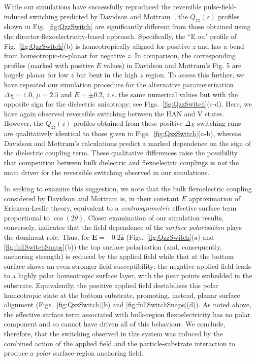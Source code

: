 \documentclass[aps,10pt,twocolumn]{revtex4}
\makeatletter
\newcommand{\vect}[1]{ \mathbf{#1} }
\newcommand{\vecth}[1]{ \mathbf{\hat{#1} } }
\newcommand{\ie}{\emph{i.e.}\@\xspace}
\makeatother
\begin{document}
While our simulations have successfully reproduced the reversible pulse-field-induced switching predicted by
Davidson and Mottram~\cite{DavidsonMottram02}, the $Q_{zz}(z)$ profiles shown in Fig.~\ref{fig:QzzSwitch} are
significantly different from those obtained using the director-flexoelectricity-based approach. Specifically, the
``E on" profile of Fig.~\ref{fig:QzzSwitch}(b) is homeotropically aligned for positive $z$ and has a bend from
homeotropic-to-planar for negative $z$. In comparison, the corresponding profiles (marked with positive $E$
values) in Davidson and Mottram's Fig. 5 are largely planar for low $z$ but bent in the high $z$ region. To assess
this further, we have repeated our simulation procedure for the alternative parameterization $\Delta\chi=1.0$,
$\mu=2.5$ and $E=\pm 0.2$, \ie the same numerical values but with the opposite sign for the dielectric anisotropy;
see Figs.~\ref{fig:QzzSwitch}(c-d). Here, we have again observed reversible switching between the HAN and V
states. However, the $Q_{zz}(z)$ profiles obtained from these positive $\Delta\chi$ switching runs are
qualitatively identical to those given in Figs.~\ref{fig:QzzSwitch}(a-b), whereas Davidson and Mottram's
calculations predict a marked dependence on the sign of the dielectric coupling term. These qualitative
differences raise the possibility that competition between bulk dielectric and flexoelectric couplings is
\emph{not} the main driver for the reversible switching observed in our simulations.

In seeking to examine this suggestion, we note that the bulk flexoelectric coupling considered by Davidson and
Mottram is, in their constant $E$ approximation of Ericksen-Leslie theory, equivalent to a \emph{centrosymmetric}
effective surface term proportional to $\cos(2 \theta)$\cite{DavidsonMottram02}. Closer examination of our
simulation results, conversely, indicates that the field dependence of the \emph{surface polarisation} plays the
dominant role. Thus, for $\vect{E}=-0.2\vecth{z}$ (Figs.~\ref{fig:QzzSwitch}(a) and \ref{fig:fullSwitchSnaps}(b))
the top surface polarisation (and, consequently, anchoring strength) is reduced by the applied field while that at
the bottom surface shows an even stronger field-susceptibility: the negative applied field leads to a highly polar
homeotropic surface layer, with the pear points embedded in the substrate. Equivalently, the positive applied
field destabilises this polar homeotropic state at the bottom substrate, promoting, instead, planar surface
alignment (Figs.~\ref{fig:QzzSwitch}(b) and \ref{fig:fullSwitchSnaps}(d)). As noted above, the effective surface
term associated with bulk-region flexoelectricity has no polar component and so cannot have driven all of this
behaviour. We conclude, therefore, that the switching observed in this system was induced by the combined action
of the applied field and the particle-substrate interaction to produce a \emph{polar} surface-region anchoring
field.
\end{document}
